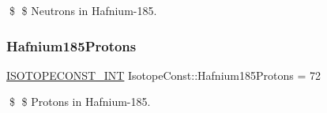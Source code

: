 \$ \$ Neutrons in Hafnium-\/185. \mbox{\label{group___isotope_const-_hafnium-_hf185_ga818c95d68eed61ea94824a995c6d6c0e}} 
\subsubsection{\texorpdfstring{Hafnium185\+Protons}{Hafnium185Protons}}
{\footnotesize\ttfamily \mbox{\hyperlink{group___isotope_const-_macros_ga5f18360b3e99483a35c32d789e62621c}{I\+S\+O\+T\+O\+P\+E\+C\+O\+N\+S\+T\+\_\+\+I\+NT}} Isotope\+Const\+::\+Hafnium185\+Protons = 72}

\$ \$ Protons in Hafnium-\/185. 